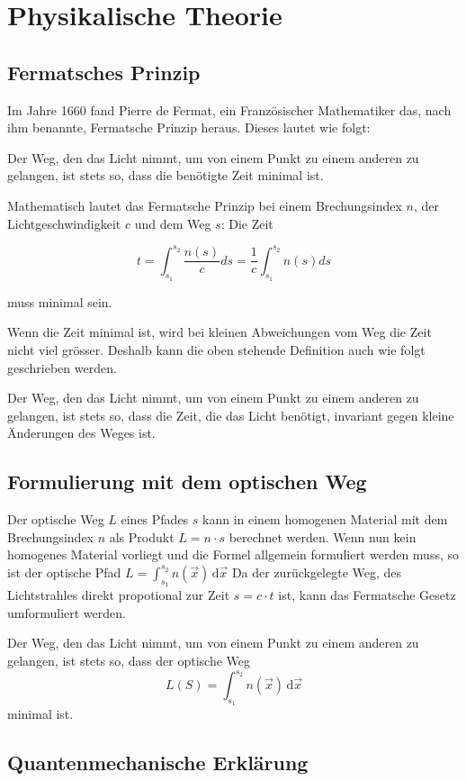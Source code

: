 \section{Physikalische Theorie}

\subsection{Fermatsches Prinzip}
Im Jahre 1660 fand Pierre de Fermat, 
ein Französischer Mathematiker das, 
nach ihm benannte, Fermatsche Prinzip heraus. 
Dieses lautet wie folgt:

Der Weg, den das Licht nimmt, 
um von einem Punkt zu einem anderen zu gelangen, 
ist stets so, dass die benötigte Zeit minimal ist.

Mathematisch lautet das Fermatsche Prinzip bei einem Brechungsindex $n$, 
der Lichtgeschwindigkeit $c$ und dem Weg $s$: 
Die Zeit

\[
t= \int_{s_1}^{s_2} \frac{n(s)}{c} ds =
\frac{1}{c} \int_{s_1}^{s_2} n(s) ds
\]

muss minimal sein.

Wenn die Zeit minimal ist, 
wird bei kleinen Abweichungen vom Weg die Zeit nicht viel grösser. 
Deshalb kann die oben stehende Definition auch wie folgt geschrieben werden.

Der Weg, den das Licht nimmt, 
um von einem Punkt zu einem anderen zu gelangen, 
ist stets so, dass die Zeit, die das Licht benötigt, 
invariant gegen kleine Änderungen des Weges ist.

\subsection{Formulierung mit dem optischen Weg}
Der optische Weg $L$  eines Pfades $s$ kann in einem homogenen Material 
mit dem Brechungsindex $n$ als Produkt $L = n \cdot s$ berechnet werden.
Wenn nun kein homogenes Material vorliegt und die Formel allgemein 
formuliert werden muss, so ist der optische Pfad $L = \int_{s_1}^{s_2} n(\vec x) \,\mathrm d \vec x$
Da der zurückgelegte Weg, des Lichtstrahles direkt propotional zur Zeit $s = c \cdot t$ ist,
kann das Fermatsche Gesetz umformuliert werden.

Der Weg, den das Licht nimmt, 
um von einem Punkt zu einem anderen zu gelangen, 
ist stets so, dass der optische Weg 
\[
L(S) = \int_{s_1}^{s_2} n(\vec x) \,\mathrm d\vec x
\]
minimal ist.

\subsection{Quantenmechanische Erklärung}
